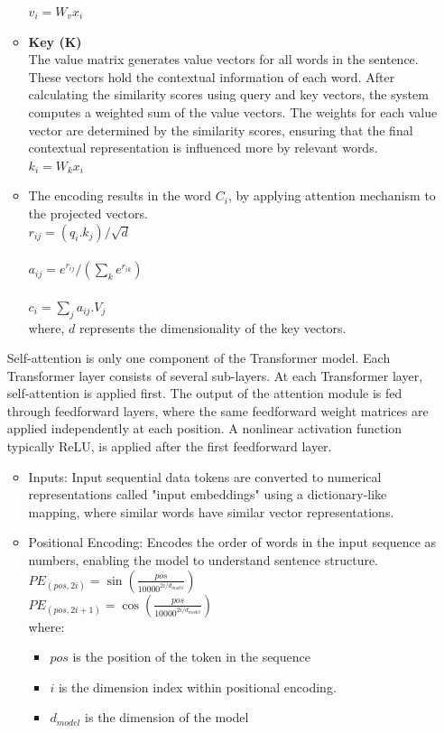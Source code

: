 \documentclass{ws-ijait}
\begin{document}
\begin{itemize}
\begin{itemize}
		$v_{i}=W_{v}x_{i}$
		\item \textbf{Key (K)}\\The value matrix generates value vectors for all words in the sentence. These vectors hold the contextual information of each word. After calculating the similarity scores using query and key vectors, the system computes a weighted sum of the value vectors. The weights for each value vector are determined by the similarity scores, ensuring that the final contextual representation is influenced more by relevant words.\\
		$k_{i}=W_{k}x_{i}$
		\item The encoding results in the word $C_i$, by applying attention mechanism to the projected vectors.	\\
		$r_{ij}=(q_{i}.k_{j})/\sqrt{d}$\\\\
		$a_{ij}=e^{r_{ij}}/(\sum_{k}^{} e^{r_{ik}})$\\\\
		$c_{i}=\sum_{j}^{} a_{ij}.V_{j}$\\
		where, $d$ represents the dimensionality of the key vectors.
	\end{itemize}
	Self-attention is only one component of the Transformer model. Each Transformer layer consists of several sub-layers. At each Transformer layer, self-attention is applied first. The output of the attention module is fed through feedforward layers, where the same feedforward weight matrices are applied independently at each position. A nonlinear activation function typically ReLU, is applied after the first feedforward layer.
	\begin{itemize}
		\item Inputs: Input sequential data tokens are converted to numerical representations called "input embeddings" using a dictionary-like mapping, where similar words have similar vector representations.
		
		\item Positional Encoding: Encodes the order of words in the input sequence as numbers, enabling the model to understand sentence structure.\\
		$P E_{(pos,2i)}=\sin (\frac{pos}{10000^{2i/{d_{model}}}})$\\
		
		$P E_{(pos,2i+1)}=\cos (\frac{pos}{10000^{2i/{d_{model}}}})$\\
		where:
		\begin{itemize}
			\item $pos$ is the position of the token in the sequence
			\item $i$ is the dimension index within positional encoding.
			\item $d_{model}$ is the dimension of the model
		\end{itemize}
		

\end{itemize}
\end{itemize}
\end{document}
